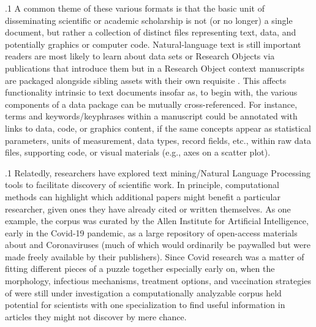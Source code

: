\documentclass[11pt, twocolumn]{article}
\begin{document}
\p.1{%
A common theme of these various formats is that the basic unit of
disseminating scientific or academic scholarship is not (or no longer)
a single document, but rather a
collection of distinct files representing text, data, and potentially
graphics or computer code. Natural-language text is still important
\mdash{} readers are most likely to learn about data sets or Research
Objects via publications that introduce them \mdash{} but in a Research
Object context manuscripts are packaged alongside sibling assets
with their own requisite . \enlargethispage{6pt}This affects functionality
intrinsic to text \vspace{1.5pt}
documents insofar as, to begin with, the various components
of a data package can be mutually cross-referenced. For instance,
terms and keywords/keyphrases within a manuscript could be annotated
with links to data, code, or graphics content, if the
same concepts appear as statistical parameters, units of
measurement, data types, record fields, etc., within raw
data files, supporting code, or visual materials
(e.g., axes on a scatter plot).
}%

\p.1{%
Relatedly, researchers have explored text mining/Natural
Language Processing tools to facilitate
discovery of scientific work. In principle,
computational methods can highlight which additional
papers might benefit a particular researcher, given ones
they have already cited or written themselves.
As one example, the \CORDOneNine{} corpus was curated by the
Allen Institute for Artificial Intelligence, early in the Covid-19 pandemic,
as a large repository of open-access materials about  and Coronaviruses
(much of which would ordinarily be paywalled but were made freely
available by their publishers). Since Covid research was a matter
of fitting different pieces of a puzzle together \mdash{} especially
early on, when the morphology, infectious mechanisms, treatment
options, and vaccination strategies of  were still
under investigation \mdash{} a computationally analyzable corpus
held potential for scientists with one specialization to
find useful information in articles they might not
discover by mere chance.
}%
\end{document}
